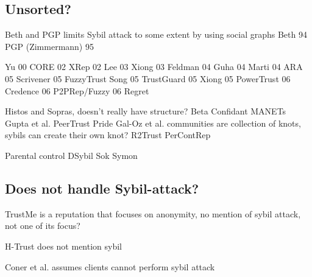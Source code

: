 \subsection{Unsorted?}

Beth and PGP limits Sybil attack to some extent by using social graphs
Beth 94\cite{beth1994valuation}
PGP (Zimmermann) 95\cite{zimmermann1995official}


Yu 00\cite{yu2000social}
CORE 02\cite{michiardi2002core}
XRep 02\cite{damiani2002reputation}
Lee 03\cite{lee2003cooperative}
Xiong 03\cite{xiong2003reputation}
Feldman 04\cite{feldman2004robust}
Guha 04\cite{guha2004propagation}
Marti 04\cite{marti2004limited}
ARA 05\cite{ham2005ara}
Scrivener 05\cite{nandi2005scrivener}
FuzzyTrust Song 05\cite{song2005trusted}
TrustGuard 05\cite{srivatsa2005trustguard}
Xiong 05\cite{xiong2007countering}
PowerTrust 06\cite{zhou2007powertrust}
Credence 06\cite{walsh2006experience}
P2PRep/Fuzzy 06\cite{aringhieri2006fuzzy}
Regret\cite{sabater2001regret, sabater2002social}

Histos and Sopras\cite{zacharia2000collaborative}, doesn't really have structure?
Beta\cite{jsang2002beta}
Confidant\cite{buchegger2002performance} MANETs
Gupta et al.\cite{gupta2003reputation}
PeerTrust\cite{xiong2004peertrust}
Pride\cite{dewan2004pride}
Gal-Oz et al. \cite{gal2008robust} communities are collection of knots, sybils
can create their own knot?
R2Trust\cite{tian2011h2trust}
PerContRep\cite{yan2014percontrep}

Parental control\cite{tehale2012parental}
DSybil\cite{yu2009dsybil}
Sok\cite{alvisi2013sok}
Symon\cite{jyothi2009symon}

\subsection{Does not handle Sybil-attack?}
TrustMe\cite{singh2003trustme} is a reputation that focuses on anonymity, no mention of sybil attack, not one of its focus?

H-Trust\cite{zhao2009htrust} does not mention sybil

Coner et al.\cite{conner2009trust} assumes clients cannot perform sybil attack

